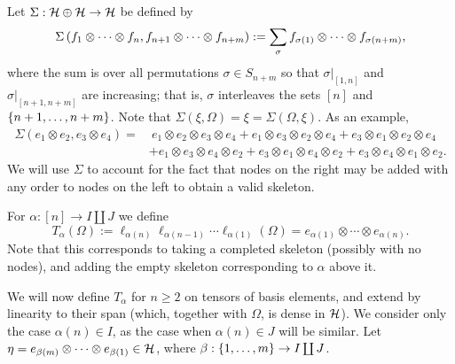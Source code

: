 Let $\Sigma : \mathcal{H} \oplus \mathcal{H} \to \mathcal{H}$ be defined by
\[
	\Sigma\left(f_1\otimes\cdots\otimes f_n, f_{n+1} \otimes \cdots \otimes f_{n+m}\right) := \sum_\sigma f_{\sigma(1)}\otimes\cdots\otimes f_{\sigma(n+m)},
\]
where the sum is over all permutations $\sigma \in S_{n+m}$ so that $\sigma|_{[1, n]}$ and $\sigma|_{[n+1, n+m]}$ are increasing; that is, $\sigma$ interleaves the sets $[n]$ and $\left\{n+1,\ldots, n+m\right\}$.
Note that $\Sigma(\xi, \Omega) = \xi = \Sigma(\Omega, \xi)$.
As an example,
\begin{align*}
	\Sigma(e_{1}\otimes e_{2}, e_{3}\otimes e_4) =& \  e_1 \otimes e_2 \otimes e_3 \otimes e_4 + e_1 \otimes e_3 \otimes e_2 \otimes e_4 + e_3 \otimes e_1 \otimes e_2 \otimes e_4   \\
	& + e_1 \otimes e_3 \otimes e_4 \otimes e_2 + e_3 \otimes e_1 \otimes e_4\otimes e_2 + e_3 \otimes e_4 \otimes e_1 \otimes e_2.
\end{align*}
We will use $\Sigma$ to account for the fact that nodes on the right may be added with any order to nodes on the left to obtain a valid skeleton.



For $\alpha : [n] \to I \coprod J$ we define
\[
	T_{\alpha}(\Omega) := \ell_{\alpha(n)} \ell_{\alpha(n-1)} \cdots \ell_{\alpha(1)}(\Omega) = e_{\alpha(1)}\otimes\cdots\otimes e_{\alpha(n)}.
\]
Note that this corresponds to taking a completed skeleton (possibly with no nodes), and adding the empty skeleton corresponding to $\alpha$ above it.


We will now define $T_{\alpha}$ for $n\geq 2$ on tensors of basis elements, and extend by linearity to their span (which, together with $\Omega$, is dense in $\mathcal{H}$).
We consider only the case $\alpha(n) \in I$, as the case when $\alpha(n) \in J$ will be similar.
Let $\eta = e_{\beta(m)}\otimes\cdots\otimes e_{\beta(1)} \in \mathcal{H}$, where $\beta : \left\{1, \ldots, m\right\} \to I \coprod J$.

